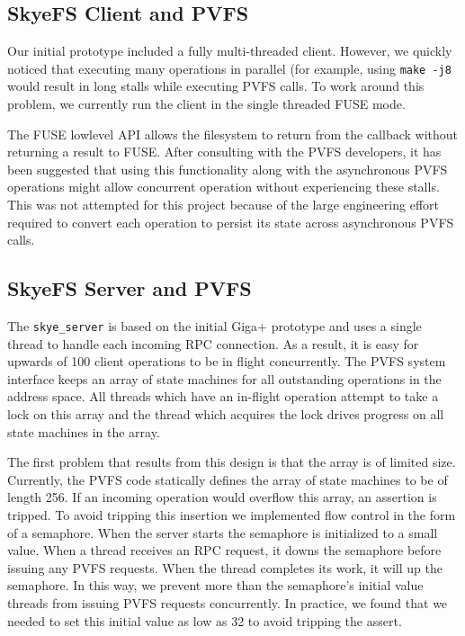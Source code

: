\documentclass[twocolumn,letterpaper]{article}
\newcommand{\code}[1]{\texttt{#1}}
\begin{document}
\subsection{SkyeFS Client and PVFS}
Our initial prototype included a fully multi-threaded client.  However, we
quickly noticed that executing many operations in parallel (for example,
using \code{make -j8} would result in long stalls while executing PVFS calls.
To work around this problem, we currently run the client in the single
threaded FUSE mode.

The FUSE lowlevel API allows the filesystem to return from the callback
without returning a result to FUSE.  After consulting with the PVFS
developers, it has been suggested that using this functionality along with the
asynchronous PVFS operations might allow concurrent operation without
experiencing these stalls.  This was not attempted for this project because of
the large engineering effort required to convert each operation to persist its
state across asynchronous PVFS calls.

\subsection{SkyeFS Server and PVFS}
The \code{skye\_server} is based on the initial Giga+ prototype and uses a
single thread to handle each incoming RPC connection.  As a result, it is easy
for upwards of 100 client operations to be in flight concurrently.  The PVFS
system interface keeps an array of state machines for all outstanding
operations in the address space.  All threads which have an in-flight
operation attempt to take a lock on this array and the thread which acquires
the lock drives progress on all state machines in the array.

The first problem that results from this design is that the array is of
limited size.  Currently, the PVFS code statically defines the array of state
machines to be of length 256.  If an incoming operation would overflow this
array, an assertion is tripped.  To avoid tripping this insertion we
implemented flow control in the form of a semaphore.  When the server starts
the semaphore is initialized to a small value.  When a thread receives an RPC
request, it downs the semaphore before issuing any PVFS requests.  When the
thread completes its work, it will up the semaphore.  In this way, we prevent
more than the semaphore's initial value threads from issuing PVFS requests
concurrently.  In practice, we found that we needed to set this initial value
as low as 32 to avoid tripping the assert.
\end{document}
